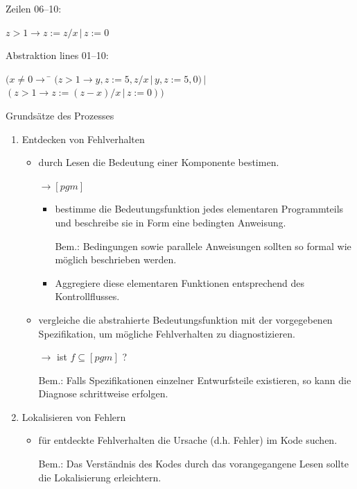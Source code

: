 Zeilen 06--10:  

\(z > 1 \rightarrow z := z / x \,|\, z := 0\)

\bigskip

Abstraktion lines 01--10:
\begin{tabbing}
$ (x \ne 0 \rightarrow $ \= $( z > 1 \rightarrow y, z := 5, z/x \,|\, y, z := 5,0) \,|\,$ \\
                         \> $( z > 1 \rightarrow z := (z-x) / x \,|\, z := 0))$ \\
\end{tabbing}


\newpage
\centerline{Grunds\"atze des Prozesses}
\bigskip

\begin{enumerate}

\item Entdecken von Fehlverhalten

\begin{itemize}

\item durch Lesen die Bedeutung einer Komponente bestimen.

$\rightarrow [pgm]$

\begin{itemize}

\item bestimme die Bedeutungsfunktion jedes elementaren Programmteils
und beschreibe sie in Form eine bedingten Anweisung.

Bem.: Bedingungen sowie parallele Anweisungen sollten so formal wie
m\"oglich beschrieben werden.

\item Aggregiere diese elementaren Funktionen entsprechend des
Kontrollflusses. 

\end{itemize}

\item vergleiche die abstrahierte Bedeutungsfunktion mit der
vorgegebenen Spezifikation, um m\"ogliche Fehlverhalten zu
diagnostizieren. 

$\rightarrow$ ist $ f \subseteq [pgm]$ ?

Bem.: Falls Spezifikationen einzelner Entwurfsteile existieren, 
so kann die Diagnose schrittweise erfolgen.

\end{itemize}

\item Lokalisieren von Fehlern

\begin{itemize}

\item f\"ur entdeckte Fehlverhalten die Ursache (d.h. Fehler) im Kode
suchen. 

Bem.: Das Verst\"andnis des Kodes durch das vorangegangene Lesen
sollte die Lokalisierung erleichtern.

\end{itemize}


\end{enumerate}

